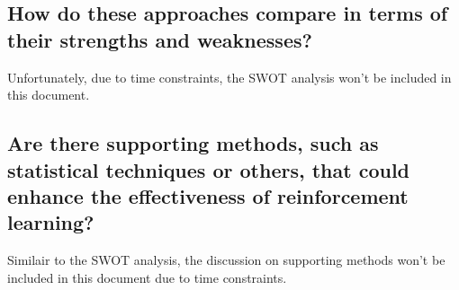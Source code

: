\subsection{How do these approaches compare in terms of their strengths and weaknesses?  }

Unfortunately, due to time constraints, the SWOT analysis won't be included in this document.

\subsection{Are there supporting methods, such as statistical techniques or others, that could enhance the effectiveness of reinforcement learning?}

Similair to the SWOT analysis, the discussion on supporting methods won't be included in this document due to time constraints.
